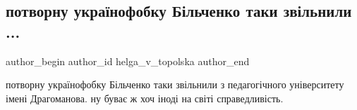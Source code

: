  
 
 
 
 
 
\subsection{потворну українофобку Більченко таки звільнили ...}
\label{sec:21_07_2021.fb.helga_v_topolska.1.bilchenko_ukrainofob}
 
\ifcmt
 author_begin
   author_id helga_v_topolska
 author_end
\fi

потворну українофобку Більченко таки звільнили з педагогічного університету
імені Драгоманова. ну буває ж хоч іноді на світі справедливість.

